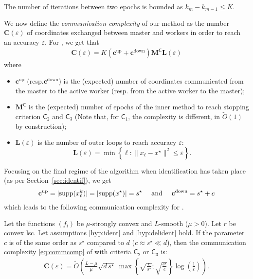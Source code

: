 \begin{assumption}
\label{hyp:delident}
The number of iterations between two epochs is bounded as $k_{m} - k_{m-1} \leq K$.
\end{assumption}

We now define the \emph{communication complexity} of our method as the number $ \mathbf{C}(\varepsilon)$ of coordinates exchanged between master and workers in order to reach an accuracy $\varepsilon$. For \recoalgo, we get that 
\begin{align}\label{eq:commcomp}
    \mathbf{C}(\varepsilon) = K( \mathbf{c}^{\mathrm{up}} + \mathbf{c}^{\mathrm{down}} ) \mathbf{M}^{\mathsf{C}} \mathbf{L}(\varepsilon) 
\end{align}
where 
\begin{itemize}
    \item $\mathbf{c^{\mathrm{up}}}$ (resp.\;$\mathbf{c^{\mathrm{down}}}$) is the (expected) number of coordinates communicated from the master to the active worker (resp. from the active worker to the master);
    \item $\mathbf{M}^{\mathsf{C}}$ is the (expected) number of epochs of the inner method to reach stopping criterion $\mathsf{C}_2$ and $\mathsf{C}_3$
    (Note that, for $\mathsf{C}_1$, the complexity is different, in $\tilde{O}(1)$ by construction);
    \item $\mathbf{L}(\varepsilon)$ is the number of outer loops to reach accuracy $\varepsilon$:
    $$
    \mathbf{L}(\varepsilon) = \min \left\{ \ell : \|x_\ell - x^\star \|^2 \leq \varepsilon \right\}.
    $$
\end{itemize}

Focusing on the final regime of the algorithm when identification has taken place (as per Section~\ref{sec:identif}), we get
\begin{align*}
    \mathbf{c^{\mathrm{up}}} = |\mathrm{supp}(x_\ell^k)| = |\mathrm{supp}(x^\star)| = s^\star \quad\text{ and }\quad \mathbf{c^{\mathrm{down}}} = s^\star + c
\end{align*}
which leads to the following communication complexity for \recoalgo.

\begin{theorem}\label{th:com}
Let the functions $(f_i)$ be $\mu$-strongly convex and $L$-smooth ($\mu>0$). Let $r$ be convex lsc. Let assumptions \ref{hyp:ident} and \ref{hyp:delident} hold.
If the parameter $c$ is of the same order as $s^\star$ compared to $d$ ($c\approx s^\star \ll d$), then the communication complexity \eqref{eq:commcomp} of \recoalgo with criteria $\mathsf{C}_2$ or $\mathsf{C}_3$ is:
\begin{align*}
     \mathbf{C}(\varepsilon) = \tilde{O}\left( \frac{L-\mu}{\mu} \sqrt{d \, s^\star } ~ \max \left\{\sqrt{\frac{c}{s^\star}};\sqrt{\frac{s^\star}{c}} \right\} \log\left( \frac{1}{\varepsilon} \right) \right).
\end{align*}
\end{theorem}


